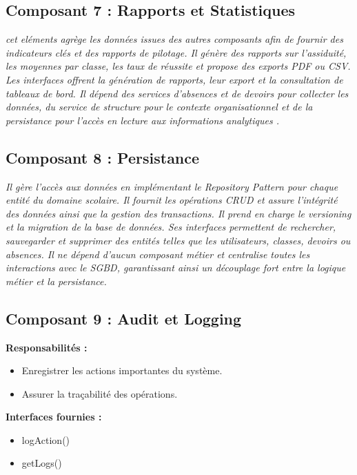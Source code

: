 \subsection{Composant 7 : Rapports et Statistiques}

\textit{cet eléments  agrège les données issues des autres composants afin de fournir des indicateurs clés et des rapports de pilotage. Il génère des rapports sur l’assiduité, les moyennes par classe, les taux de réussite et propose des exports PDF ou CSV. Les interfaces offrent la génération de rapports, leur export et la consultation de tableaux de bord. Il dépend des services d’absences et de devoirs pour collecter les données, du service de structure pour le contexte organisationnel et de la persistance pour l’accès en lecture aux informations analytiques . }

\subsection{Composant 8 : Persistance}

\textit{Il gère l’accès aux données en implémentant le Repository Pattern pour chaque entité du domaine scolaire. Il fournit les opérations CRUD et assure l’intégrité des données ainsi que la gestion des transactions. Il prend en charge le versioning et la migration de la base de données. Ses interfaces permettent de rechercher, sauvegarder et supprimer des entités telles que les utilisateurs, classes, devoirs ou absences. Il ne dépend d’aucun composant métier et centralise toutes les interactions avec le SGBD, garantissant ainsi un découplage fort entre la logique métier et la persistance.}

\subsection{Composant 9 : Audit et Logging}

\textbf{Responsabilités :}


\begin{itemize}
\item Enregistrer les actions importantes du système.
\item Assurer la traçabilité des opérations.
\end{itemize}

\textbf{Interfaces fournies :}
\begin{itemize}
\item logAction()
\item getLogs()
\end{itemize}

